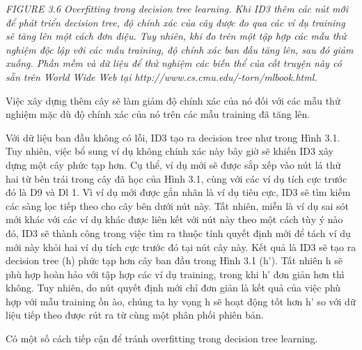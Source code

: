\noindent\textit{FIGURE 3.6 Overfitting trong decision tree learning. Khi ID3 thêm các nút mới để phát triển decision tree, độ chính xác của cây được đo qua các ví dụ training sẽ tăng lên một cách đơn điệu. Tuy nhiên, khi đo trên một tập hợp các mẫu thử nghiệm độc lập với các mẫu training, độ chính xác ban đầu tăng lên, sau đó giảm xuống. Phần mềm và dữ liệu để thử nghiệm các biến thể của cốt truyện này có sẵn trên World Wide Web tại http://www.cs.cmu.edu/-torn/mlbook.html.}

Việc xây dựng thêm cây sẽ làm giảm độ chính xác của nó đối với các mẫu thử nghiệm mặc dù độ chính xác của nó trên các mẫu training đã tăng lên.

Với dữ liệu ban đầu không có lỗi, ID3 tạo ra decision tree như trong Hình 3.1. Tuy nhiên, việc bổ sung ví dụ không chính xác này bây giờ sẽ khiến ID3 xây dựng một cây phức tạp hơn. Cụ thể, ví dụ mới sẽ được sắp xếp vào nút lá thứ hai từ bên trái trong cây đã học của Hình 3.1, cùng với các ví dụ tích cực trước đó là D9 và Dl 1. Vì ví dụ mới được gắn nhãn là ví dụ tiêu cực, ID3 sẽ tìm kiếm các sàng lọc tiếp theo cho cây bên dưới nút này. Tất nhiên, miễn là ví dụ sai sót mới khác với các ví dụ khác được liên kết với nút này theo một cách tùy ý nào đó, ID3 sẽ thành công trong việc tìm ra thuộc tính quyết định mới để tách ví dụ mới này khỏi hai ví dụ tích cực trước đó tại nút cây này. Kết quả là ID3 sẽ tạo ra decision tree (h) phức tạp hơn cây ban đầu trong Hình 3.1 (h'). Tất nhiên h sẽ phù hợp hoàn hảo với tập hợp các ví dụ training, trong khi h' đơn giản hơn thì không. Tuy nhiên, do nút quyết định mới chỉ đơn giản là kết quả của việc phù hợp với mẫu training ồn ào, chúng ta hy vọng h sẽ hoạt động tốt hơn h' so với dữ liệu tiếp theo được rút ra từ cùng một phân phối phiên bản.

Có một số cách tiếp cận để tránh overfitting trong decision tree learning.

